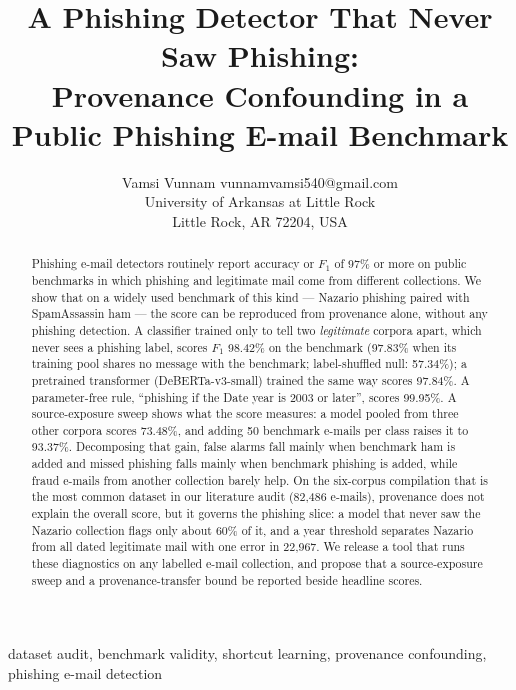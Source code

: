 \documentclass[twoside,11pt]{article}
\begin{document}
\title{A Phishing Detector That Never Saw Phishing:\\
Provenance Confounding in a Public Phishing E-mail Benchmark}

\author{\name Vamsi Vunnam \email vunnamvamsi540@gmail.com \\
       \addr University of Arkansas at Little Rock\\
       Little Rock, AR 72204, USA}

\editor{}

\maketitle

\begin{abstract}
Phishing e-mail detectors routinely report accuracy or $F_1$ of 97\% or more
on public benchmarks in which phishing and legitimate mail come from different
collections. We show that on a widely used benchmark of this kind --- Nazario
phishing paired with SpamAssassin ham --- the score can be reproduced from
provenance alone, without any phishing detection. A classifier trained only to
tell two \emph{legitimate} corpora apart, which never sees a phishing label,
scores $F_1$ 98.42\% on the benchmark (97.83\% when its training pool shares
no message with the benchmark; label-shuffled null: 57.34\%); a
pretrained transformer (DeBERTa-v3-small) trained the same way scores
97.84\%. A parameter-free rule, ``phishing if the Date year is 2003 or
later'', scores 99.95\%. A source-exposure sweep shows what the score
measures: a model pooled from three other corpora scores 73.48\%, and adding
50 benchmark e-mails per class raises it to 93.37\%. Decomposing that gain,
false alarms fall mainly when benchmark ham is added and missed phishing falls
mainly when benchmark phishing is added, while fraud e-mails from another
collection barely help. On the six-corpus compilation that is the most
common dataset in our literature audit (82,486 e-mails), provenance does not explain the overall score, but
it governs the phishing slice: a model that never saw the Nazario collection
flags only about 60\% of it, and a year threshold separates Nazario from all
dated legitimate mail with one error in 22,967. We release a tool that runs
these diagnostics on any labelled e-mail collection, and propose that a
source-exposure sweep and a provenance-transfer bound be reported beside
headline scores.
\end{abstract}

\begin{keywords}
  dataset audit, benchmark validity, shortcut learning, provenance
  confounding, phishing e-mail detection
\end{keywords}
\end{document}
